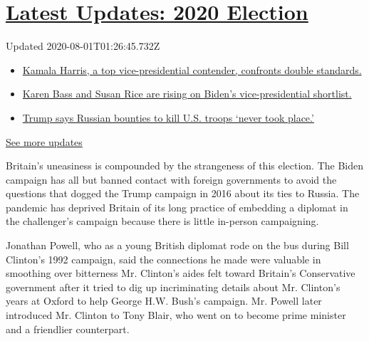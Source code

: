 \hypertarget{latest-updates-2020-election}{%
\section{\texorpdfstring{\href{https://www.nytimes.com/2020/07/31/us/elections/biden-vs-trump.html?action=click\&pgtype=Article\&state=default\&region=MAIN_CONTENT_1\&context=storylines_live_updates}{Latest
Updates: 2020
Election}}{Latest Updates: 2020 Election}}\label{latest-updates-2020-election}}

Updated 2020-08-01T01:26:45.732Z

\begin{itemize}
\tightlist
\item
  \href{https://www.nytimes.com/2020/07/31/us/elections/biden-vs-trump.html?action=click\&pgtype=Article\&state=default\&region=MAIN_CONTENT_1\&context=storylines_live_updates\#link-29fdff45}{Kamala
  Harris, a top vice-presidential contender, confronts double
  standards.}
\item
  \href{https://www.nytimes.com/2020/07/31/us/elections/biden-vs-trump.html?action=click\&pgtype=Article\&state=default\&region=MAIN_CONTENT_1\&context=storylines_live_updates\#link-13ec3d9c}{Karen
  Bass and Susan Rice are rising on Biden's vice-presidential
  shortlist.}
\item
  \href{https://www.nytimes.com/2020/07/31/us/elections/biden-vs-trump.html?action=click\&pgtype=Article\&state=default\&region=MAIN_CONTENT_1\&context=storylines_live_updates\#link-49e9a016}{Trump
  says Russian bounties to kill U.S. troops `never took place.'}
\end{itemize}

\href{https://www.nytimes.com/2020/07/31/us/elections/biden-vs-trump.html?action=click\&pgtype=Article\&state=default\&region=MAIN_CONTENT_1\&context=storylines_live_updates}{See
more updates}

Britain's uneasiness is compounded by the strangeness of this election.
The Biden campaign has all but banned contact with foreign governments
to avoid the questions that dogged the Trump campaign in 2016 about its
ties to Russia. The pandemic has deprived Britain of its long practice
of embedding a diplomat in the challenger's campaign because there is
little in-person campaigning.

Jonathan Powell, who as a young British diplomat rode on the bus during
Bill Clinton's 1992 campaign, said the connections he made were valuable
in smoothing over bitterness Mr. Clinton's aides felt toward Britain's
Conservative government after it tried to dig up incriminating details
about Mr. Clinton's years at Oxford to help George H.W. Bush's campaign.
Mr. Powell later introduced Mr. Clinton to Tony Blair, who went on to
become prime minister and a friendlier counterpart.

